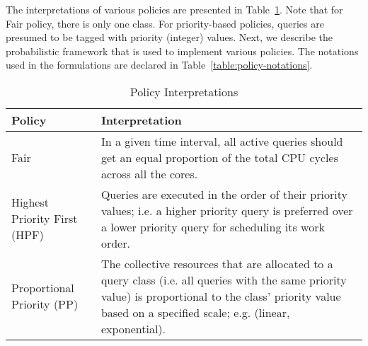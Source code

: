 The interpretations of various policies are presented in Table~\ref{table:policy-interpreatations}.
Note that for Fair policy, there is only one class. 
For priority-based policies, queries are presumed to be tagged with priority (integer) values. 
Next, we describe the probabilistic framework that is used to implement various policies. 
The notations used in the formulations are declared in Table~\ref{table:policy-notations}.

\begin{table}[]
\centering
\begin{tabular}{|p{1.3cm}|p{6.5cm}|}
\hline
\textbf{Policy} & \textbf{Interpretation} \\ \hline
Fair & In a given time interval, all active queries should get an equal proportion of the total CPU cycles across all the cores. \\ \hline%
Highest Priority First (HPF) & 
Queries are executed in the order of their priority values; i.e. a higher priority query is preferred over a lower priority query for scheduling its work order. \\ \hline
Proportional Priority (PP) & 
The collective resources that are allocated to a query class (i.e. all queries with the same priority value) is proportional to the class' priority value based on a specified scale; e.g. (linear, exponential).
\\ \hline
\end{tabular}
\caption{Policy Interpretations}
\label{table:policy-interpreatations}
	\vspace{-2.5em}
\end{table}

